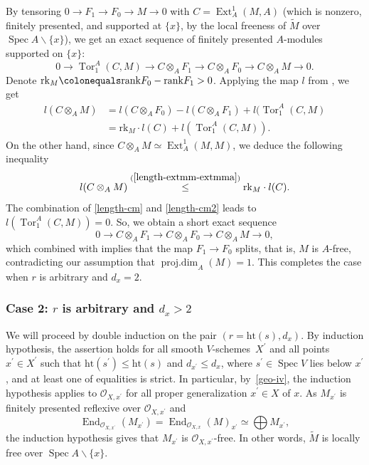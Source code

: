 \documentclass[JEP,XML,SOM,Unicode,published]{cedram}
\let\backslash\smallsetminus
\newcommand{\sO}{\mathscr{O}}
\let\wt\widetilde
\let\ce\colonequals
\newcommand{\pr}{^{\prime}}
\DeclareMathOperator{\Spec}{Spec}
\DeclareMathOperator{\pd}{proj.dim}
\DeclareMathOperator{\Ext}{Ext}
\DeclareMathOperator{\Tor}{Tor}
\DeclareMathOperator{\End}{End}
\theoremstyle{plain}
\theoremstyle{definition}
\begin{document}
By tensoring $0\to F_1\to F_0\to M\to 0$ with $C=\Ext_A^1(M,A)$ (which is nonzero, finitely presented, and supported at $\{x\}$, by the local freeness of $\wt{M}$ over $\Spec A\backslash \{x\}$), we get an exact sequence of finitely presented $A$\nobreakdash-mod\-ules supported on $\{x\}$:
\[
0\to \Tor^A_1(C,M) \to C\otimes_A F_1 \to C\otimes_A F_0 \to C\otimes_A M \to 0.
\]
Denote $\mathrm{rk}_M\ce \mathrm{rank} F_0-\mathrm{rank} F_1 >0$.
Applying the map $l$ from , we get
\begin{equation}\label{length-cm}
\begin{split}
l(C\otimes_A M) & = l(C\otimes_A F_0)-l(C\otimes_A F_1)+ l(\Tor^A_1(C,M) \\
& = \mathrm{rk}_M\cdot l(C)+l(\Tor^A_1(C,M)).
\end{split}
\end{equation}
On the other hand, since $C\otimes_A M\simeq \Ext^1_A(M,M) $, we deduce the following inequality
\begin{equation}\label{length-cm2}
l(C\otimes_A M) \overset{(\ref{length-extmm-extmma})}\le \mathrm{rk}_M\cdot l(C).
\end{equation}
The combination of \eqref{length-cm} and \eqref{length-cm2} leads to $l(\Tor_1^A(C,M))=0$.
So, we obtain a short exact sequence
\[
0\to C\otimes_A F_1 \to C\otimes_A F_0 \to C\otimes_A M \to 0,
\]
which combined with  implies that the map $F_1\to F_0$ splits, that is, $M$ is $A$-free, contradicting our assumption that $\pd_A(M)=1$. This completes the case when $r$ is arbitrary and $d_x=2$.

\subsubsection*{Case 2: $r$ is arbitrary and $d_x>2$}
We will proceed by double induction on the pair $(r=\text{ht}(s),d_x)$. By induction hypothesis, the assertion holds for {all smooth $V$\nobreakdash-schemes}~$X\pr$ and all points $x\pr\in X\pr$ such that $\text{ht}(s\pr)\le \text{ht}(s)$ and $d_{x\pr} \le d_x$, where $s\pr\in \Spec V$ lies below $x\pr$, and at least one of equalities is strict.
In particular, by~\eqref{geo-iv}, the induction hypothesis applies to $\sO_{X,x\pr}$ for all proper generalization $x\pr\in X$ of $x$.
As $M_{x\pr}$ is finitely presented reflexive over $\sO_{X,x\pr}$ and
\[
\End_{\sO_{X,x\pr}}(M_{x\pr})=\End_{\sO_{X,x}}(M)_{x\pr} \simeq \bigoplus M_{x\pr},
\]
the induction hypothesis gives that $M_{x\pr}$ is $\sO_{X,x\pr}$-free.
In other words, $\widetilde{M}$ is locally free over $\Spec A \backslash \{x\}$.
\end{document}
